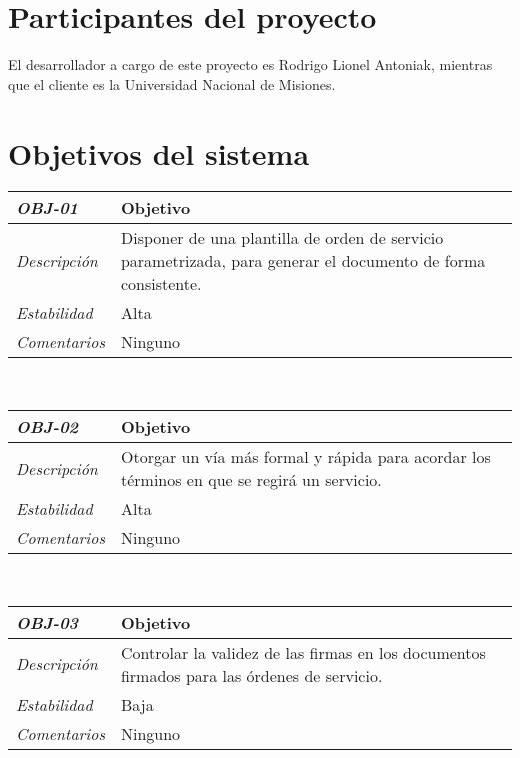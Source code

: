 \section{Participantes del proyecto}
\normalsize{ \indent
El desarrollador a cargo de este proyecto es
Rodrigo Lionel Antoniak, mientras que el cliente
es la Universidad Nacional de Misiones.
}
\section{Objetivos del sistema}
\begin{center}
\begin{tabular}{ | p{4.5cm} | p{11cm} | }
	\hline
	\rowcolor{lightgray}
	\hfil \textbf{\textit{OBJ-01}} &
	\hfil \textbf{Objetivo}  \\
	\hline
	\raggedleft \textit{Descripci\'on} &
	Disponer de una plantilla de orden
	de servicio parametrizada, para generar
	el documento de forma consistente. \\
	\hline
	\raggedleft \textit{Estabilidad} & Alta \\
	\hline
	\raggedleft \textit{Comentarios} & Ninguno \\
	\hline
\end{tabular} \\[1cm]
\begin{tabular}{ | p{4.5cm} | p{11cm} | }
	\hline
	\rowcolor{lightgray}
	\hfil \textbf{\textit{OBJ-02}} &
	\hfil \textbf{Objetivo}  \\
	\hline
	\raggedleft \textit{Descripci\'on} &
	Otorgar un v\'ia m\'as formal y
	r\'apida para acordar los t\'erminos
	en que se regir\'a un servicio. \\
	\hline
	\raggedleft \textit{Estabilidad} & Alta \\
	\hline
	\raggedleft \textit{Comentarios} & Ninguno \\
	\hline
\end{tabular} \\[1cm]
\begin{tabular}{ | p{4.5cm} | p{11cm} | }
	\hline
	\rowcolor{lightgray}
	\hfil \textbf{\textit{OBJ-03}} &
	\hfil \textbf{Objetivo}  \\
	\hline
	\raggedleft \textit{Descripci\'on} &
	Controlar la validez de las firmas
	en los documentos firmados para las
	\'ordenes de servicio. \\
	\hline
	\raggedleft \textit{Estabilidad} & Baja \\
	\hline
	\raggedleft \textit{Comentarios} & Ninguno \\

\end{tabular}
\end{center}
